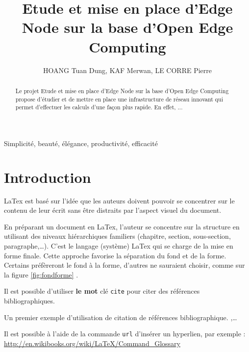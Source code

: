 \documentclass[twocolumn,a4paper]{IEEEtranfr}
\begin{document}
\title{Etude et mise en place d'Edge Node sur la base d'Open Edge Computing}
\author{HOANG Tuan Dung, KAF Merwan, LE CORRE Pierre} 

\maketitle

\begin{abstract}
Le projet Etude et mise en place d'Edge Node sur la base d'Open Edge Computing propose d'étudier et de mettre en place une infrastructure de réseau innovant qui permet d'effectuer les calculs d'une façon plus rapide. En effet, ...
\end{abstract} 

\begin{keywords}
Simplicité, beauté, élégance, productivité, efficacité
\end{keywords}



\section{Introduction}

 LaTex est basé sur l'idée que les auteurs doivent pouvoir se concentrer sur le contenu de leur écrit sans être distraits par l'aspect visuel du document. 

En préparant un document en LaTex, l'auteur se concentre sur la structure en
utilisant des niveaux hiérarchiques familiers
(chapitre, section, sous-section, paragraphe,\ldots). C'est le langage
(système) LaTex qui se charge de la mise en forme finale. Cette approche favorise la séparation du
fond et de la forme. Certains préfèreront le fond à la forme, d'autres ne
sauraient choisir, comme sur la figure \ref{fig:fondforme} . 

Il est possible d'utiliser {\color{red}\textbf{le mot}} clé {\tt cite} pour citer des références
bibliographiques.  

Un premier exemple d'utilisation de citation de références bibliographique. 
\cite{akgu07},\cite{akgu091}\cite{zwic00}\cite{loredo_accuracy_2001}\ldots

Il est possible à l'aide de la commande {\tt url{}} d'insérer un
hyperlien, par exemple : \url{http://en.wikibooks.org/wiki/LaTeX/Command_Glossary}
\end{document}
